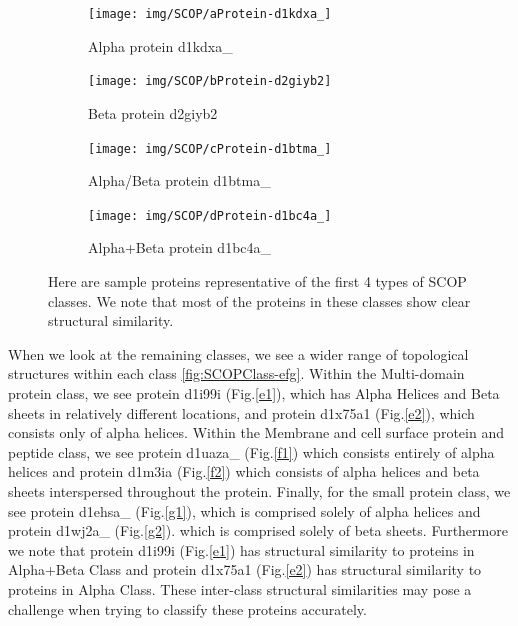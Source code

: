 \documentclass[12pt, a4paper, twocolumn, fullpage]{article}
\theoremstyle{plain}
\theoremstyle{definition}
\theoremstyle{remark}
\begin{document}
\begin{figure}[t]
\centering
\begin{subfigure}{.5\textwidth}
  \centering
  \texttt{[image: img/SCOP/aProtein-d1kdxa\_]}
  \caption{Alpha protein d1kdxa\_}
\end{subfigure}%
\begin{subfigure}{.5\textwidth}
  \centering
  \texttt{[image: img/SCOP/bProtein-d2giyb2]}
  \caption{Beta protein d2giyb2}
\end{subfigure}
\begin{subfigure}{.5\textwidth}
  \centering
  \texttt{[image: img/SCOP/cProtein-d1btma\_]}
  \caption{Alpha/Beta protein d1btma\_}
\end{subfigure}%
\begin{subfigure}{.5\textwidth}
  \centering
  \texttt{[image: img/SCOP/dProtein-d1bc4a\_]}
  \caption{Alpha+Beta protein d1bc4a\_}
\end{subfigure}%
\caption{Here are sample proteins representative of the first 4 types of SCOP classes. We note that most of the proteins in these classes show clear structural similarity.}
\label{fig:SCOPClass-abcd}
\end{figure}

When we look at the remaining classes, we see a wider range of topological structures within each class \ref{fig:SCOPClass-efg}. Within the Multi-domain protein class, we see protein d1i99i (Fig.\ref{e1}), which has Alpha Helices and Beta sheets in relatively different locations, and protein d1x75a1 (Fig.\ref{e2}), which consists only of alpha helices. Within the Membrane and cell surface protein and peptide class, we see protein d1uaza\_ (Fig.\ref{f1}) which consists entirely of alpha helices and protein d1m3ia (Fig.\ref{f2}) which consists of alpha helices and beta sheets interspersed throughout the protein. Finally, for the small protein class, we see protein d1ehsa\_ (Fig.\ref{g1}), which is comprised solely of alpha helices and protein d1wj2a\_ (Fig.\ref{g2}). which is comprised solely of beta sheets. Furthermore we note that protein d1i99i (Fig.\ref{e1}) has structural similarity to proteins in Alpha+Beta Class and protein d1x75a1 (Fig.\ref{e2}) has structural similarity to proteins in Alpha Class. These inter-class structural similarities may pose a challenge when trying to classify these proteins accurately.
\end{document}
